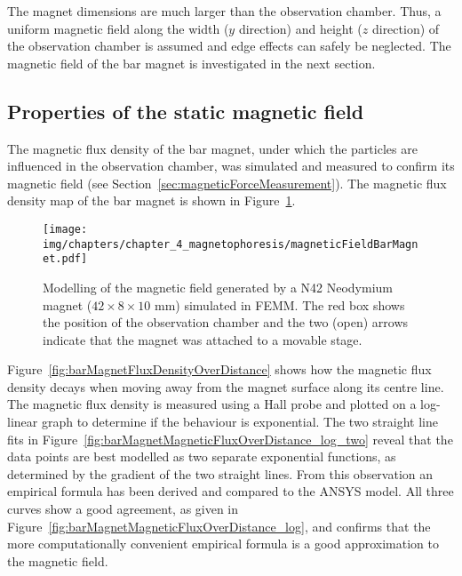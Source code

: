 The magnet dimensions are much larger than the observation chamber. Thus, a uniform magnetic field along the width ($y$ direction) and height ($z$ direction) of the observation chamber is assumed and edge effects can safely be neglected. The magnetic field of the bar magnet is investigated in the next section.

\subsection{Properties of the static magnetic field}
The magnetic flux density of the bar magnet, under which the particles are influenced in the observation chamber, was simulated and measured to confirm its magnetic field (see Section~\ref{sec:magneticForceMeasurement}). The magnetic flux density map of the bar magnet is shown in Figure~\ref{fig:barMagnetFluxDensityMap}.

\begin{figure}[htb]
   \centering
   \texttt{[image: img/chapters/chapter\_4\_magnetophoresis/magneticFieldBarMagnet.pdf]}
   \caption[Magnetic flux density map of a N42 Neodymium bar magnet]{Modelling of the magnetic field generated by a N42 Neodymium magnet ($42\times8\times10$ mm) simulated in FEMM. The red box shows the position of the observation chamber and the two (open) arrows indicate that the magnet was attached to a movable stage.}
   \label{fig:barMagnetFluxDensityMap}
\end{figure}

Figure~\ref{fig:barMagnetFluxDensityOverDistance} shows how the magnetic flux density decays when moving away from the magnet surface along its centre line. The magnetic flux density is measured using a Hall probe and plotted on a log-linear graph to determine if the behaviour is exponential. The two straight line fits in Figure~\ref{fig:barMagnetMagneticFluxOverDistance_log_two} reveal that the data points are best modelled as two separate exponential functions, as determined by the gradient of the two straight lines. From this observation an empirical formula has been derived and compared to the ANSYS model. All three curves show a good agreement, as given in Figure~\ref{fig:barMagnetMagneticFluxOverDistance_log}, and confirms that the more computationally convenient empirical formula is a good approximation to the magnetic field.


